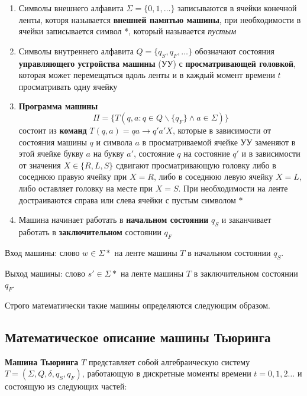 \begin{enumerate}
    \item Символы внешнего алфавита $\Sigma = \{0,1,\dots\}$ записываются в ячейки конечной ленты, которя называется \textbf{внешней памятью машины}, при необходимости в ячейки записывается символ *, который называется \textit{пустым}
    \item Символы внутреннего алфавита $Q=\{q_S,q_F,\dots\}$ обозначают состояния \textbf{управляющего устройства машины} (УУ) с \textbf{просматривающей головкой}, которая может перемещаться вдоль ленты и в каждый момент времени $t$ просматривать одну ячейку
    \item \textbf{Программа машины} $$\Pi = \{T(q,a:q\in Q \backslash \{q_F\} \land a \in \Sigma)\}$$ состоит из \textbf{команд} $T(q, a) = qa \to q'a'X$, которые в зависимости от состояния машины $q$ и символа $a$ в просматриваемой ячейке УУ заменяют в этой ячейке букву $a$ на букву $a'$, состояние $q$ на состояние $q'$ и в зависимости от значения $X \in \{R, L, S\}$ сдвигают просматривающую головку либо в соседнюю правую ячейку при $X = R$, либо в соседнюю левую ячейку $X = L$, либо оставляет головку на месте при $X = S$. При необходимости на ленте достраиваются справа или слева ячейки с пустым символом $*$
    \item Машина начинает работать в \textbf{начальном состоянии} $q_S$ и заканчивает работать в \textbf{заключительном} состоянии $q_F$
\end{enumerate}

Вход машины: слово $w \in \Sigma*$ на ленте машины $T$ в начальном состоянии $q_S$.

Выход машины: слово $s' \in \Sigma*$ на ленте машины $T$ в заключительном состоянии $q_F$.

Строго математически такие машины определяются следующим образом.

\subsection{Математическое описание машины Тьюринга}
\dftion \textbf{Машина Тьюринга} $T$ представляет собой алгебраическую систему $T = (\Sigma, Q, \delta, q_S, q_F)$, работающую в дискретные моменты времени $t=0,1,2\dots$ и состоящую из следующих частей:

